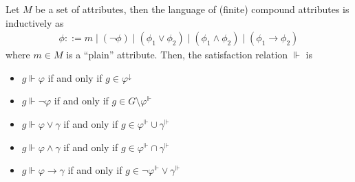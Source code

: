 \begin{definition}
	\label{definition:compound-attributes-2} Let $M$ be a set of attributes, then the language of (finite) compound
	attributes is inductively as
	\begin{align}
		\phi ::= m \mid (\neg \phi) \mid (\phi_{1}\lor \phi_{2}) \mid (\phi_{1}\land \phi_{2}) \mid (\phi_{1}\rightarrow \phi_{2})
	\end{align}
	where $m \in M$ is a ``plain'' attribute. Then, the satisfaction relation $\Vdash$ is

	\begin{itemize}
		\item $g \Vdash \varphi$ if and only if $g \in \varphi^{\downarrow}$

		\item $g \Vdash \neg \varphi$ if and only if $g \in G \setminus \varphi^{\Vdash}$

		\item $g \Vdash \varphi \lor \gamma$ if and only if $g \in \varphi^{\Vdash}\cup \gamma^{\Vdash}$

		\item $g \Vdash \varphi \land \gamma$ if and only if $g \in \varphi^{\Vdash}\cap \gamma^{\Vdash}$

		\item $g \Vdash \varphi \rightarrow \gamma$ if and only if $g \in \neg \varphi^{\Vdash}\lor \gamma^{\Vdash}$
	\end{itemize}
\end{definition}
